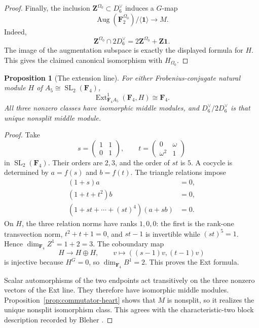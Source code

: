 \documentclass[11pt]{article}
\newtheorem{proposition}[theorem]{Proposition}
\theoremstyle{definition}
\theoremstyle{remark}
\newcommand{\F}{\mathbf F}
\newcommand{\Z}{\mathbf Z}
\newcommand{\Aug}{\operatorname{Aug}}
\newcommand{\Ext}{\operatorname{Ext}}
\begin{document}
\begin{proof}
Finally, the inclusion \(\Z^{\Omega_0}\subset D_6^\vee\) induces a
\(G\)-map
\[
 \Aug(\F_2^{\Omega_0})/\langle\mathbf1\rangle\longrightarrow M.
\]
Indeed,
\[
 \Z^{\Omega_0}\cap2D_6^\vee
    =2\Z^{\Omega_0}+\Z\mathbf1.
\]
The image of the augmentation subspace is exactly the displayed formula for
\(H\).  This gives the claimed canonical isomorphism with
\(H_{\Omega_0}\).
\end{proof}

\begin{proposition}[The extension line]
\label{prop:extension-line}
For either Frobenius-conjugate natural module \(H\) of
\(A_5\cong\operatorname{SL}_2(\F_4)\),
\[
                 \Ext^1_{\F_4A_5}(\F_4,H)\cong\F_4.
\]
All three nonzero classes have isomorphic middle modules, and
\(D_6^\vee/2D_6^\vee\) is that unique nonsplit middle module.
\end{proposition}

\begin{proof}
Take
\[
 s=\begin{pmatrix}1&1\\0&1\end{pmatrix},\qquad
 t=\begin{pmatrix}0&\omega\\\omega^2&1\end{pmatrix}
\]
in \(\operatorname{SL}_2(\F_4)\).  Their orders are \(2,3\), and the order of
\(st\) is \(5\).  A cocycle is determined by \(a=f(s)\) and \(b=f(t)\).
The triangle relations impose
\[
\begin{aligned}
 (1+s)a&=0,\\
 (1+t+t^2)b&=0,\\
 (1+st+\cdots+(st)^4)(a+sb)&=0.
\end{aligned}
\]
On \(H\), the three relation norms have ranks \(1,0,0\): the first is the
rank-one transvection norm, \(t^2+t+1=0\), and \(st-1\) is invertible while
\((st)^5=1\).  Hence \(\dim_{\F_4}Z^1=1+2=3\).  The coboundary map
\[
 H\longrightarrow H\oplus H,\qquad
 v\longmapsto((s-1)v,(t-1)v)
\]
is injective because \(H^G=0\), so \(\dim_{\F_4}B^1=2\).  This proves the
Ext formula.

Scalar automorphisms of the two endpoints act transitively on the three
nonzero vectors of the Ext line.  They therefore have isomorphic middle
modules.  Proposition~\ref{prop:commutator-heart} shows that \(M\) is
nonsplit, so it realizes the unique nonsplit isomorphism class.  This agrees
with the characteristic-two block description recorded by Bleher
\cite[\S3.3]{Bleher2002}.
\end{proof}
\end{document}
